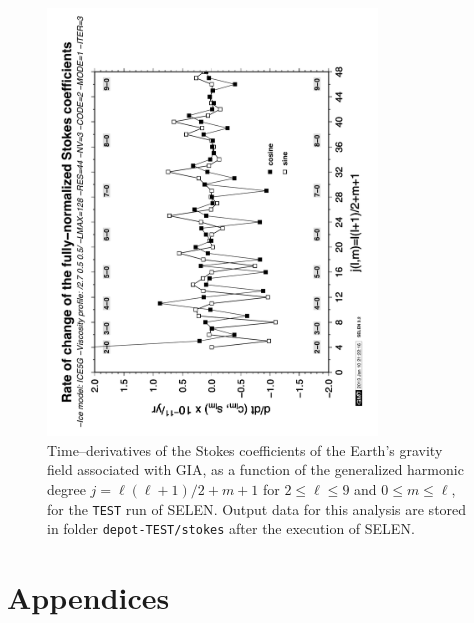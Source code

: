 \documentclass[11pt,fleqn,a4paper,titlepage]{article}
\newcommand\selens{\textsf{SELEN}}
\begin{document}
\begin{figure}[p]
\begin{center}
\includegraphics[width=0.78\textwidth, angle=-90]{./Figures/stokes.png}
\caption[Time variation of the Stokes coefficients]{\small{Time--derivatives of the Stokes coefficients of the Earth's gravity field associated with GIA, as a function of the generalized harmonic degree $j=\ell(\ell+1)/2+m+1$ for $2\le \ell\le 9$ and $0\le m \le\ell$, for the \texttt{TEST} run of \selens. Output data for this analysis are stored in folder \texttt{depot-TEST/stokes} after the execution of \selens.}}
\label{fig:stokes}
\end{center}
\end{figure}
\clearpage

\section{Appendices}
\end{document}

